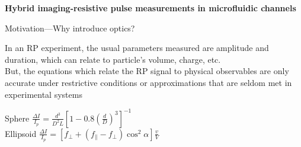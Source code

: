 

\begin{frame}[c]{}
	\begin{center}
		\textbf{Hybrid imaging-resistive pulse measurements in microfluidic channels}
	\end{center}
\end{frame}





\begin{frame}[c]{Motivation---Why introduce optics?}
	
	In an RP experiment, the usual parameters measured are amplitude and duration, which can relate to particle's volume, charge, etc. \\
	
	But, the equations which relate the RP signal to physical observables are only accurate under restrictive conditions or approximations that are seldom met in experimental systems \\
	
	
	\vspace{.25in}
	
	{\centering
		Sphere \hspace{.2in} $\frac{\Delta I}{I_{p}}=\frac{d^{3}}{D^{2}L}\left[1-0.8\left(\frac{d}{D}\right)^{3}\right]^{-1}$ \\
		\vspace{.1in}
		Ellipsoid \hspace{.2in} $\frac{\Delta I}{I_{p}}=\left[f_{\perp}+\left(f_{\parallel}-f_{\perp}\right)\cos^{2}\alpha\right]\frac{v}{V}$ \\
	}
	
		 



\end{frame}



